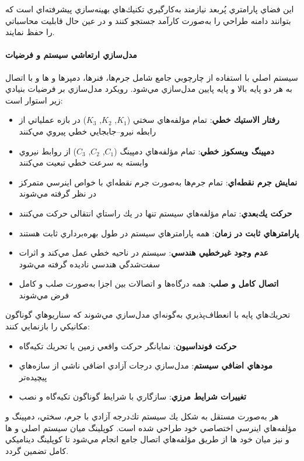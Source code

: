 اين فضاي پارامتري پُربعد نيازمند به‌كارگيري تكنيك‌هاي بهينه‌سازي پيشرفته‌اي است كه بتوانند دامنه طراحي را به‌صورت كارآمد جستجو كنند و در عين حال قابليت محاسباتي را حفظ نمايند.

\paragraph{مدل‌سازي ارتعاشي سيستم و فرضيات}

سيستم اصلي  با استفاده از چارچوبي جامع شامل جرم‌ها، فنرها، دمپرها و ‌ها و با اتصال به هر دو پايه بالا و پايه پايين مدل‌سازي مي‌شود. رويكرد مدل‌سازي بر فرضيات بنيادي زير استوار است:

\begin{itemize}
    \item \textbf{رفتار الاستيك خطي}: تمام مؤلفه‌هاي سختي ($K_1$, $K_2$, $K_3$) در بازه عملياتي از رابطه نيرو–جابجايي خطي پيروي مي‌كنند
    \item \textbf{دمپينگ ويسكوز خطي}: تمام مؤلفه‌هاي دمپينگ ($C_1$, $C_2$, $C_3$) از روابط نيروي وابسته به سرعت خطي تبعيت مي‌كنند
    \item \textbf{نمايش جرم نقطه‌اي}: تمام جرم‌ها به‌صورت جرم نقطه‌اي با خواص اينرسي متمركز در نظر گرفته مي‌شوند
    \item \textbf{حركت يك‌بعدي}: تمام مؤلفه‌هاي سيستم تنها در يك راستاي انتقالی حركت مي‌كنند
    \item \textbf{پارامترهاي ثابت در زمان}: همه پارامترهاي سيستم در طول بهره‌برداري ثابت هستند
    \item \textbf{عدم وجود غيرخطيي هندسي}: سيستم در ناحيه خطي عمل مي‌كند و اثرات سفت‌شدگي هندسي ناديده گرفته مي‌شود
    \item \textbf{اتصال كامل و صلب}: همه درگاه‌ها و اتصالات بين اجزا به‌صورت صلب و كامل فرض مي‌شوند
\end{itemize}

تحريك‌هاي پايه با انعطاف‌پذيري به‌گونه‌اي مدل‌سازي مي‌شوند كه سناريوهاي گوناگون مكانيكي را بازنمايي كنند:
\begin{itemize}
    \item \textbf{حركت فونداسيون}: نمايانگر حركت واقعي زمين يا تحريك تكيه‌گاه
    \item \textbf{مودهاي اضافي سيستم}: مدل‌سازي درجات آزادي اضافي ناشي از سازه‌هاي پيچيده‌تر
    \item \textbf{تغييرات شرايط مرزي}: سازگاري با شرايط گوناگون تكيه‌گاه و نصب
\end{itemize}

هر  به‌صورت مستقل به شكل يك سيستم تك‌درجه آزادي با جرم، سختي، دمپينگ و مؤلفه‌هاي اينرسي اختصاصي خود طراحي شده است. كوپلينگ ميان سيستم اصلي و ‌ها و نيز ميان خود ‌ها از طريق مؤلفه‌هاي اتصال جامع انجام مي‌شود تا كوپلينگ ديناميكي كامل تضمين گردد.

